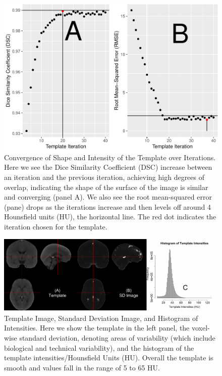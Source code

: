 \documentclass[]{elsarticle} %
\makeatletter
\def\maxwidth{\ifdim\Gin@nat@width>\linewidth\linewidth
\else\Gin@nat@width\fi}
\let\Oldincludegraphics\includegraphics
\renewcommand{\includegraphics}[1]{\Oldincludegraphics[width=\maxwidth]{#1}}
\makeatother
\begin{document}
\begin{figure}
\centering
\includegraphics{index_files/figure-latex/performance-1.pdf}
\caption{\label{fig:performance}Convergence of Shape and Intensity of the Template over Iterations. Here we see the Dice Similarity Coefficient (DSC) increase between an iteration and the previous iteration, achieving high degrees of overlap, indicating the shape of the surface of the image is similar and converging (panel A). We also see the root mean-squared error (pane) drops as the iterations increase and then levels off around 4 Hounsfield units (HU), the horizontal line. The red dot indicates the iteration chosen for the template.}
\end{figure}

\begin{figure}
\centering
\includegraphics{index_files/figure-latex/template-1.pdf}
\caption{\label{fig:template}Template Image, Standard Deviation Image, and Histogram of Intensities. Here we show the template in the left panel, the voxel-wise standard deviation, denoting areas of variability (which include biological and technical variability), and the histogram of the template intensities/Hounsfield Units (HU). Overall the template is smooth and values fall in the range of 5 to 65 HU.}
\end{figure}
\end{document}
